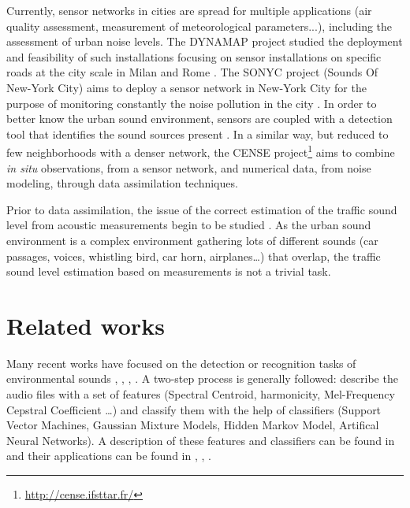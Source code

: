 \documentclass[twocolumn]{svjour3}          %
\begin{document}
Currently, sensor networks in cities are spread for multiple applications (air quality assessment, measurement of meteorological parameters...), including the assessment of urban noise levels. The DYNAMAP project \cite{dynamap_2016} studied the deployment and feasibility of such installations focusing on sensor installations on specific roads at the city scale in Milan and Rome \cite{bellucci_life_2017}.
The SONYC project (Sounds Of New-York City) aims to deploy a sensor network in New-York City for the purpose of monitoring constantly the noise pollution in the city \cite{mydlarz2017implementation}. In order to better know the urban sound environment, sensors are coupled with a detection tool that identifies the sound sources present \cite{salamon2017deep}. In a similar way, but reduced to few neighborhoods with a denser network, the CENSE project\footnote{\url{http://cense.ifsttar.fr/}} \cite{picaut2017characterization} aims to combine \textit{in situ} observations, from a sensor network, and numerical data, from noise modeling, through data assimilation techniques.

Prior to data assimilation, the issue of the correct estimation of the traffic sound level from acoustic measurements begin to be studied \cite{leiba2017large,socoro_anomalous_2017}. As the urban sound environment is a complex environment gathering lots of different sounds (car passages, voices, whistling bird, car horn, airplanes\dots) that overlap, the traffic sound level estimation based on measurements is not a trivial task.

\section{Related works}
Many recent works have focused on the detection or recognition tasks of environmental sounds \cite{heittola_sound_2011}, \cite{defreville_automatic_2006}, \cite{dufaux_automatic_2000}, \cite{chu_environmental_2009}. A two-step process is generally followed: describe the audio files with a set of features (Spectral Centroid, harmonicity, Mel-Frequency Cepstral Coefficient \dots) and classify them with the help of classifiers (Support Vector Machines, Gaussian Mixture Models, Hidden Markov Model, Artifical Neural Networks). A description of these features and classifiers can be found in \cite{cowling_comparison_2003} and their applications can be found in \cite{shen_environmental_2012}, \cite{beritelli_pattern_2008}, \cite{couvreur_automatic_2004}.
\end{document}
